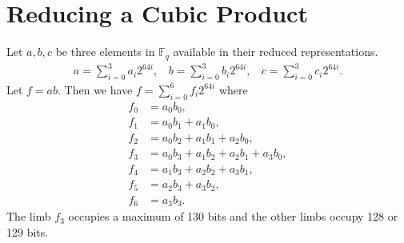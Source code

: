 \documentclass[a4paper, 12pt]{article}
\begin{document}
\section{Reducing a Cubic Product}%
\label{sec:reducing_a_cubic_product}
Let $a,b,c$ be three elements in $\mathbb{F}_q$ available in their reduced representations.
\begin{align*}
  a = \sum^{3}_{i=0} a_i 2^{64i}, \ \ \ \ b = \sum^{3}_{i=0} b_i 2^{64i}, \ \ \ \ c = \sum^{3}_{i=0} c_i 2^{64i}.
\end{align*}
Let $f = ab$. Then we have $f = \sum_{i=0}^{6} f_i 2^{64i}$ where
\begin{align*}
  f_0 & = a_0b_0,\\
  f_1 & = a_0b_1 + a_1b_0,\\
  f_2 & = a_0b_2 + a_1b_1 + a_2b_0,\\
  f_3 & = a_0b_3 + a_1b_2 + a_2b_1 + a_3b_0,\\
  f_4 & = a_1b_3 + a_2b_2 + a_3b_1,\\
  f_5 & = a_2b_3 + a_3b_2,\\
  f_6 & = a_3b_3.
\end{align*}
The limb $f_3$ occupies a maximum of 130 bits and the other limbs occupy 128 or 129 bits.
\end{document}
